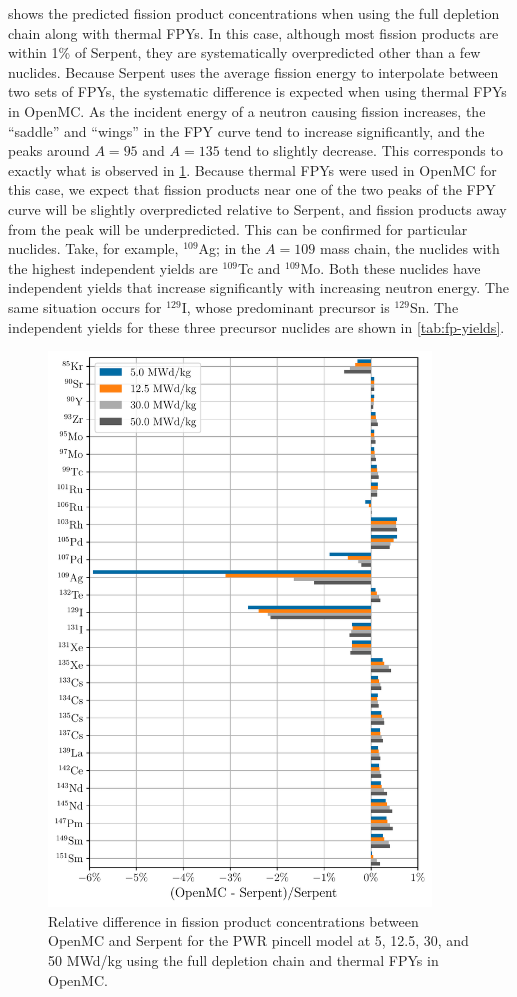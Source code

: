\documentclass[3p,authoryear]{elsarticle}
\begin{document}
 shows the predicted fission product concentrations
when using the full depletion chain along with thermal FPYs. In this case,
although most fission products are within 1\% of Serpent, they are
systematically overpredicted other than a few nuclides. Because Serpent uses the
average fission energy to interpolate between two sets of FPYs, the systematic
difference is expected when using thermal FPYs in OpenMC. As the incident energy
of a neutron causing fission increases, the ``saddle'' and ``wings'' in the FPY
curve tend to increase significantly, and the peaks around $A=95$ and $A=135$
tend to slightly decrease. This corresponds to exactly what is observed in
\cref{fig:pwr-fp-full-thermal}. Because thermal FPYs were used in OpenMC for
this case, we expect that fission products near one of the two peaks of the FPY
curve will be slightly overpredicted relative to Serpent, and fission products
away from the peak will be underpredicted. This can be confirmed for particular
nuclides. Take, for example, $^{109}$Ag; in the $A=109$ mass chain, the nuclides
with the highest independent yields are $^{109}$Tc and $^{109}$Mo. Both these
nuclides have independent yields that increase significantly with increasing
neutron energy. The same situation occurs for $^{129}$I, whose predominant
precursor is $^{129}$Sn. The independent yields for these three precursor
nuclides are shown in \cref{tab:fp-yields}.
\begin{figure}[H]
  \centering
  \includegraphics[width=4in]{figures/pwr_fp_full_thermal.pdf}
  \caption{Relative difference in fission product concentrations between OpenMC
  and Serpent for the PWR pincell model at 5, 12.5, 30, and 50 MWd/kg using the
  full depletion chain and thermal FPYs in OpenMC.}
  \label{fig:pwr-fp-full-thermal}
\end{figure}
\end{document}
